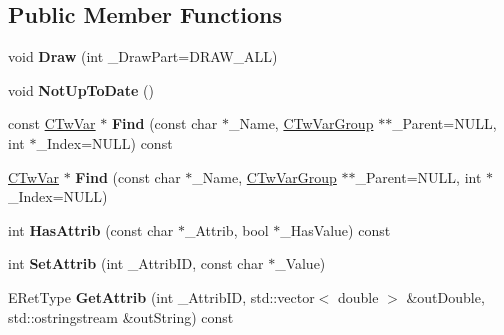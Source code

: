 \subsection*{Public Member Functions}
\begin{DoxyCompactItemize}
\item 
\hypertarget{struct_c_tw_bar_ac89eb6f52fbe10d7f50c7e9767e13d18}{void {\bfseries Draw} (int \+\_\+\+Draw\+Part=D\+R\+A\+W\+\_\+\+A\+L\+L)}\label{struct_c_tw_bar_ac89eb6f52fbe10d7f50c7e9767e13d18}

\item 
\hypertarget{struct_c_tw_bar_a3f44ceaf87bb3739181664601f446aa2}{void {\bfseries Not\+Up\+To\+Date} ()}\label{struct_c_tw_bar_a3f44ceaf87bb3739181664601f446aa2}

\item 
\hypertarget{struct_c_tw_bar_ab45b8ef8b7e270c663423edec5c7ebf7}{const \hyperlink{struct_c_tw_var}{C\+Tw\+Var} $\ast$ {\bfseries Find} (const char $\ast$\+\_\+\+Name, \hyperlink{struct_c_tw_var_group}{C\+Tw\+Var\+Group} $\ast$$\ast$\+\_\+\+Parent=N\+U\+L\+L, int $\ast$\+\_\+\+Index=N\+U\+L\+L) const }\label{struct_c_tw_bar_ab45b8ef8b7e270c663423edec5c7ebf7}

\item 
\hypertarget{struct_c_tw_bar_ae4aa8f4b033635e24840873e219e5691}{\hyperlink{struct_c_tw_var}{C\+Tw\+Var} $\ast$ {\bfseries Find} (const char $\ast$\+\_\+\+Name, \hyperlink{struct_c_tw_var_group}{C\+Tw\+Var\+Group} $\ast$$\ast$\+\_\+\+Parent=N\+U\+L\+L, int $\ast$\+\_\+\+Index=N\+U\+L\+L)}\label{struct_c_tw_bar_ae4aa8f4b033635e24840873e219e5691}

\item 
\hypertarget{struct_c_tw_bar_ac544cb5238d2e99501d1c6056864071b}{int {\bfseries Has\+Attrib} (const char $\ast$\+\_\+\+Attrib, bool $\ast$\+\_\+\+Has\+Value) const }\label{struct_c_tw_bar_ac544cb5238d2e99501d1c6056864071b}

\item 
\hypertarget{struct_c_tw_bar_a1b573983506c23eb5eb9652ee737b317}{int {\bfseries Set\+Attrib} (int \+\_\+\+Attrib\+I\+D, const char $\ast$\+\_\+\+Value)}\label{struct_c_tw_bar_a1b573983506c23eb5eb9652ee737b317}

\item 
\hypertarget{struct_c_tw_bar_a503684bba2c544523b5aac9ee5715316}{E\+Ret\+Type {\bfseries Get\+Attrib} (int \+\_\+\+Attrib\+I\+D, std\+::vector$<$ double $>$ \&out\+Double, std\+::ostringstream \&out\+String) const }\label{struct_c_tw_bar_a503684bba2c544523b5aac9ee5715316}


\end{DoxyCompactItemize}
